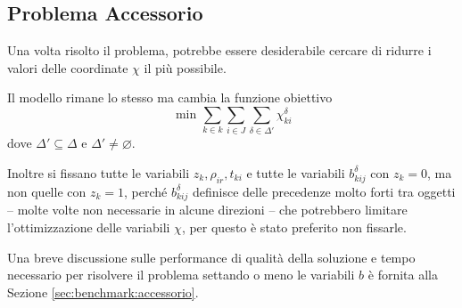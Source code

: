 \subsection{Problema Accessorio}
\label{sec:multi:problemaAcessorio}
Una volta risolto il problema, potrebbe essere desiderabile cercare di ridurre 
i valori delle coordinate
$\chi$ il più possibile.

Il modello rimane lo stesso ma cambia la funzione obiettivo
\begin{equation}
\text{ min } \sum_{k\in k}\sum_{i \in J}\sum_{\delta \in \Delta'} \chi_{ki}^\delta
\end{equation}
dove $\Delta' \subseteq \Delta$ e $\Delta' \neq \varnothing$.

Inoltre si fissano tutte le variabili $z_k, \rho_{ir}, t_{ki}$ e tutte le 
variabili $b_{kij}^\delta$ con $z_k = 0$, ma non quelle con $z_k = 1$, perché 
$b_{kij}^\delta$ definisce delle precedenze molto forti tra oggetti -- molte 
volte non necessarie in alcune direzioni -- che potrebbero limitare 
l'ottimizzazione delle variabili $\chi$, per questo è stato preferito non 
fissarle.

Una breve discussione sulle performance di qualità della soluzione e tempo
necessario per risolvere il problema settando o meno le variabili $b$ è fornita
alla Sezione \ref{sec:benchmark:accessorio}.

